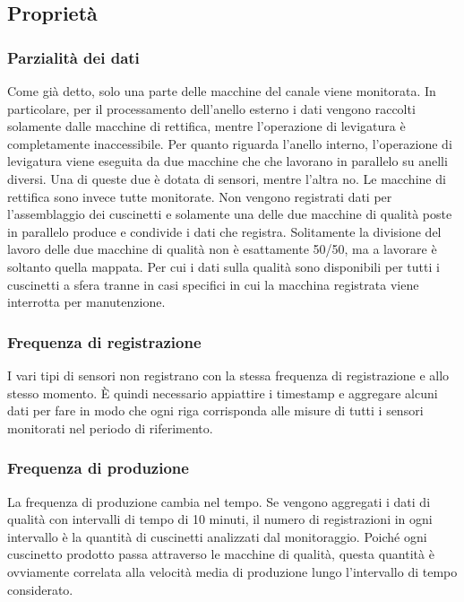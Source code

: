 \subsection{Proprietà}

\subsubsection{Parzialità dei dati}
Come già detto, solo una parte delle macchine del canale viene monitorata.
In particolare, per il processamento dell'anello esterno i dati vengono raccolti solamente dalle macchine di rettifica, mentre l'operazione di levigatura è completamente inaccessibile.
Per quanto riguarda l'anello interno, l'operazione di levigatura viene eseguita da due macchine che che lavorano in parallelo su anelli diversi. Una di queste due è dotata di sensori, mentre l'altra no. Le macchine di rettifica sono invece tutte monitorate.
Non vengono registrati dati per l'assemblaggio dei cuscinetti e solamente una delle due macchine di qualità poste in parallelo produce e condivide i dati che registra. Solitamente la divisione del lavoro delle due macchine di qualità non è esattamente 50/50, ma a lavorare è soltanto quella mappata. Per cui i dati sulla qualità sono disponibili per tutti i cuscinetti a sfera tranne in casi specifici in cui la macchina registrata viene interrotta per manutenzione.

\subsubsection{Frequenza di registrazione}
I vari tipi di sensori non registrano con la stessa frequenza di registrazione e allo stesso momento.
È quindi necessario appiattire i timestamp e aggregare alcuni dati per fare in modo che ogni riga corrisponda alle misure di tutti i sensori monitorati nel periodo di riferimento.


\subsubsection{Frequenza di produzione}
La frequenza di produzione cambia nel tempo. Se vengono aggregati i dati di qualità con intervalli di tempo di 10 minuti, il numero di registrazioni in ogni intervallo è la quantità di cuscinetti analizzati dal monitoraggio.
Poiché ogni cuscinetto prodotto passa attraverso le macchine di qualità, questa quantità è ovviamente correlata alla velocità media di produzione
lungo l'intervallo di tempo considerato. 

